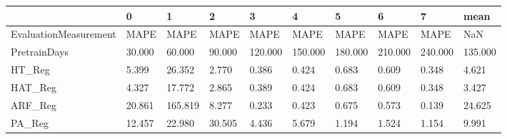 \begin{tabular}{llllllllll}
\toprule
{} &      0 &       1 &      2 &       3 &       4 &       5 &       6 &       7 &    mean \\
\midrule
EvaluationMeasurement &   MAPE &    MAPE &   MAPE &    MAPE &    MAPE &    MAPE &    MAPE &    MAPE &     NaN \\
PretrainDays          & 30.000 &  60.000 & 90.000 & 120.000 & 150.000 & 180.000 & 210.000 & 240.000 & 135.000 \\
HT\_Reg                &  5.399 &  26.352 &  2.770 &   0.386 &   0.424 &   0.683 &   0.609 &   0.348 &   4.621 \\
HAT\_Reg               &  4.327 &  17.772 &  2.865 &   0.389 &   0.424 &   0.683 &   0.609 &   0.348 &   3.427 \\
ARF\_Reg               & 20.861 & 165.819 &  8.277 &   0.233 &   0.423 &   0.675 &   0.573 &   0.139 &  24.625 \\
PA\_Reg                & 12.457 &  22.980 & 30.505 &   4.436 &   5.679 &   1.194 &   1.524 &   1.154 &   9.991 \\
\bottomrule
\end{tabular}

